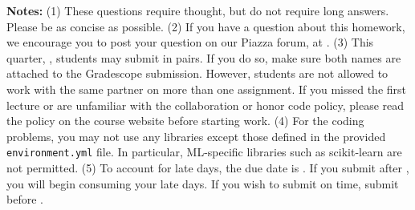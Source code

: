 {\bf Notes:} 
(1) These questions require thought, but do not require long
answers. Please be as concise as possible.  
(2) If you have a question
about this homework, we encourage you to post your question on our
Piazza forum, at \piazza. 
(3) This quarter, \qtr, students may submit in pairs. If you do so, make sure both names are attached to the Gradescope submission. However, students are not allowed to work with the same partner on more than one assignment. If you
missed the first lecture or are unfamiliar with the collaboration or honor
code policy, please read the policy on the course website before starting work.
(4) For the coding problems, you may not
use any libraries except those defined in the provided \texttt{environment.yml}
file. In particular, ML-specific libraries such as scikit-learn are not
permitted. 
(5) To account for late days, the due date is \due. If you submit after
\due, you will begin consuming your
late days. If you wish to submit on time, submit before \due.

